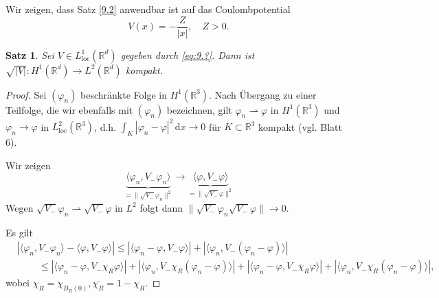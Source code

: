 \documentclass[
paper=a4,
bibtotocnumbered,
liststotocnumbered,
tablecaptionabove,
pointlessnumbers,
twoside,
openright,
10pt
]
{report}
\let\phi\varphi
\newtheorem{satz}[thm]{Satz}
\theoremstyle{definition}
\numberwithin{equation}{chapter}
\begin{document}
Wir zeigen, dass Satz \ref{9.2} anwendbar ist auf das Coulombpotential
\begin{equation}\label{eq:9.?}
V(x) = - \frac{Z}{|x|}, \quad Z>0.
\end{equation}

\begin{satz}
Sei $V\in L^1_{\text{loc}}(\mathbb R^d)$ gegeben durch \eqref{eq:9.?}. Dann ist $\sqrt{|V|}: H^1(\mathbb R^d) \to L^2(\mathbb R^d)$ kompakt.
\end{satz}
\begin{proof}
Sei $(\phi_n)$ beschränkte Folge in $H^1(\mathbb R^3)$. Nach Übergang zu einer Teilfolge, die wir ebenfalls mit $(\phi_n)$ bezeichnen, gilt $\phi_n \rightharpoonup \phi$ in $H^1(\mathbb R^3)$ und $\phi_n \to \phi$ in $L^2_{\text{loc}}(\mathbb R^3)$, d.h. $\int_K |\phi_n - \phi|^2 \, \mathrm dx \to 0$ für $K\subset \mathbb R^3$ kompakt (vgl. Blatt 6).

Wir zeigen $$\underbrace{\langle \phi_n, V_- \phi_n\rangle}_{=\| \sqrt{V_-} \phi_n\|^2} \to \underbrace{\langle \phi, V_- \phi\rangle}_{=\| \sqrt{V_-} \phi\|^2}$$
Wegen $\sqrt{V_-} \phi_n \rightharpoonup \sqrt{V_-} \phi$ in $L^2$ folgt dann $\| \sqrt{V_-} \phi_n \sqrt{V_-} \phi\|\to 0$.

Es gilt
\begin{align*}
&|\langle \phi_n, V_- \phi_n \rangle - \langle \phi, V_- \phi\rangle|
\le |\langle \phi_n - \phi, V_- \phi\rangle | + |\langle \phi_n, V_-(\phi_n - \phi) \rangle |\\
&\ \qquad \le |\langle \phi_n - \phi, V_- \chi_R \phi\rangle| + |\langle \phi_n, V_- \chi_R (\phi_n - \phi)\rangle | + |\langle \phi_n - \phi, V_- \overline\chi_R \phi\rangle|+ |\langle \phi_n , V_- \overline{\chi_R} (\phi_n - \phi)\rangle|,
\end{align*}
wobei $\chi_R= \chi_{B_R(0)}, \overline{\chi_R} = 1- \chi_R$.  


\end{proof}
\end{document}
